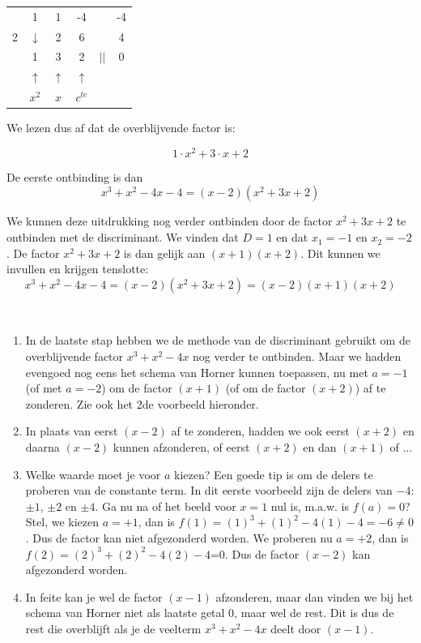 \begin{voorbeeld}
\begin{center}
	\begin{tabular}{c|ccccc}
		& 1 & 1 & -4 & & -4 \\
		2 & $\downarrow$ & 2 & 6 & & 4\\
		\hline 
		& 1 & 3 & 2 & $||$ & 0 \\
		& $\uparrow$ & $\uparrow$ & $\uparrow$ & & \\
		& $x^2$ & $x$ & $c^{te}$ & &
	\end{tabular}
\end{center}

We lezen dus af dat de overblijvende factor is:

\begin{equation*}
1\cdot x^2+3\cdot x+2
\end{equation*}

De eerste ontbinding is dan
\begin{equation*}
x^3+x^2-4x-4=(x-2)(x^2+3x+2)
\end{equation*}


We kunnen deze uitdrukking nog verder ontbinden door de factor $x^2+3x+2$ te ontbinden met de discriminant. We vinden dat $D=1$ en dat $x_1=-1$ en $x_2=-2$. De factor $x^2+3x+2$  is dan gelijk aan $(x+1)(x+2)$. Dit kunnen we invullen en krijgen tenslotte:
\begin{equation*}
x^3+x^2-4x-4=(x-2)(x^2+3x+2)=(x-2)(x+1)(x+2)
\end{equation*}


\begin{opmerking}
	\ \\
	\begin{enumerate}
	\item In de laatste stap hebben we de methode van de discriminant gebruikt om de overblijvende factor $x^3+x^2-4x$ nog verder te ontbinden. Maar we hadden evengoed nog eens het schema van Horner kunnen toepassen, nu met $a=-1$ (of met $a=-2$) om de factor $(x+1)$ (of om de factor $(x+2)$) af te zonderen. Zie ook het 2de voorbeeld hieronder.
	\item In plaats van eerst $(x-2)$ af te zonderen, hadden we ook eerst $(x+2)$ en daarna $(x-2)$ kunnen afzonderen, of eerst $(x+2)$ en dan $(x+1)$ of ...
	\item Welke waarde moet je voor $a$ kiezen? Een goede tip is om de delers te proberen van de constante term. In dit eerste voorbeeld zijn de delers van $-4$: $\pm1$, $\pm2$ en $\pm4$. Ga nu na of het beeld voor $x=1$ nul is, m.a.w. is $f(a)=0$? Stel, we kiezen $a=+1$, dan is $f(1)=(1)^3+(1)^2-4(1)-4=-6\ne 0$. Dus de factor  kan niet afgezonderd worden. We proberen nu $a=+2$, dan is $f(2)=(2)^3+(2)^2-4(2)-4$=0. Dus de factor $(x-2)$ kan afgezonderd worden.
	\item In feite kan je wel de factor $(x-1)$ afzonderen, maar dan vinden we bij het schema van Horner niet als laatste getal 0, maar wel de rest. Dit is dus de rest die overblijft als je de veelterm $x^3+x^2-4x$ deelt door $(x-1)$.
\end{enumerate}

\end{opmerking}
\end{voorbeeld}


